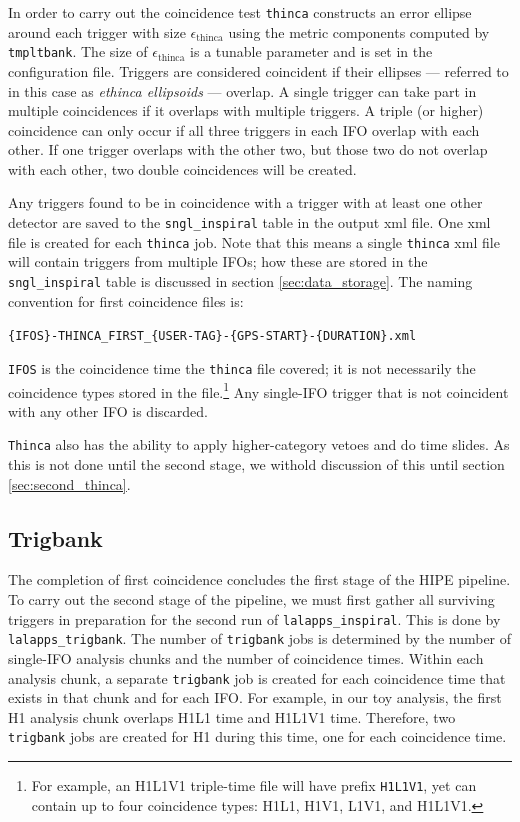 In order to carry out the coincidence test \texttt{thinca} constructs an error ellipse around each trigger with size $\epsilon_{\mathrm{thinca}}$ using the metric components computed by \texttt{tmpltbank}. The size of $\epsilon_{\mathrm{thinca}}$ is a tunable parameter and is set in the configuration file. Triggers are considered coincident if their ellipses --- referred to in this case as \emph{ethinca ellipsoids} --- overlap. A single trigger can take part in multiple coincidences if it overlaps with multiple triggers. A triple (or higher) coincidence can only occur if all three triggers in each \ac{IFO} overlap with each other. If one trigger overlaps with the other two, but those two do not overlap with each other, two double coincidences will be created.

Any triggers found to be in coincidence with a trigger with at least one other detector are saved to the \texttt{sngl\_inspiral} table in the output xml file. One xml file is created for each \texttt{thinca} job. Note that this means a single \texttt{thinca} xml file will contain triggers from multiple \acp{IFO}; how these are stored in the \texttt{sngl\_inspiral} table is discussed in section \ref{sec:data_storage}. The naming convention for first coincidence files is:
\begin{center}
\texttt{\{IFOS\}-THINCA\_FIRST\_\{USER-TAG\}-\{GPS-START\}-\{DURATION\}.xml}
\end{center}
\texttt{IFOS} is the coincidence time the \texttt{thinca} file covered; it is not necessarily the coincidence types stored in the file.\footnote{For example, an H1L1V1 triple-time file will have prefix \texttt{H1L1V1}, yet can contain up to four coincidence types: H1L1, H1V1, L1V1, and H1L1V1.} Any single-\ac{IFO} trigger that is not coincident with any other \ac{IFO} is discarded.

\texttt{Thinca} also has the ability to apply higher-category vetoes and do time slides. As this is not done until the second stage, we withold discussion of this until section \ref{sec:second_thinca}.

\subsection{Trigbank}
\label{sec:tribank}

The completion of first coincidence concludes the first stage of the \ac{HIPE} pipeline. To carry out the second stage of the pipeline, we must first gather all surviving triggers in preparation for the second run of \texttt{lalapps\_inspiral}. This is done by \texttt{lalapps\_trigbank}. The number of \texttt{trigbank} jobs is determined by the number of single-\ac{IFO} analysis chunks and the number of coincidence times. Within each analysis chunk, a separate \texttt{trigbank} job is created for each coincidence time that exists in that chunk and for each \ac{IFO}. For example, in our toy analysis, the first H1 analysis chunk overlaps H1L1 time and H1L1V1 time. Therefore, two \texttt{trigbank} jobs are created for H1 during this time, one for each coincidence time.

